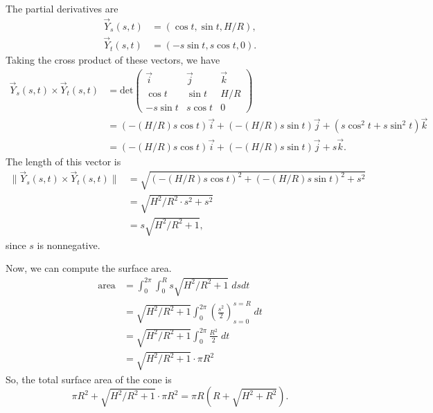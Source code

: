\documentclass{ximera}
\begin{document}
\begin{example}
The partial derivatives are
\begin{align*}
\vec{Y}_s(s,t) &= (\cos t, \sin t, H/R),\\
\vec{Y}_t(s,t) &= (-s\sin t, s\cos t, 0).
\end{align*}
Taking the cross product of these vectors, we have
\begin{align*}
\vec{Y}_s(s,t)\times\vec{Y}_t(s,t) &= \text{det}\begin{pmatrix}
\vec{i} & \vec{j} & \vec{k} \\
\cos t & \sin t & H/R\\
-s\sin t & s\cos t & 0
\end{pmatrix}\\
&= (-(H/R) s\cos t)\vec{i} + (-(H/R)s\sin t)\vec{j} + (s\cos^2 t + s\sin^2 t)\vec{k}\\
&= (-(H/R) s\cos t)\vec{i} + (-(H/R)s\sin t)\vec{j} + s\vec{k}.
\end{align*}
The length of this vector is
\begin{align*}
\|\vec{Y}_s(s,t)\times\vec{Y}_t(s,t)\| &= \sqrt{(-(H/R) s\cos t)^2 + (-(H/R) s\sin t)^2 + s^2}\\
&= \sqrt{H^2/R^2\cdot s^2 + s^2}\\
&= s\sqrt{H^2/R^2+1},
\end{align*}
since $s$ is nonnegative.

Now, we can compute the surface area.
\begin{align*}
\text{area} &= \int_0^{2\pi}\int_0^R s\sqrt{H^2/R^2+1}\;dsdt\\
&= \sqrt{H^2/R^2+1}\int_0^{2\pi} \left(\frac{s^2}{2}\right)_{s = 0}^{s = R}\;dt\\
&= \sqrt{H^2/R^2+1}\int_0^{2\pi} \frac{R^2}{2}\;dt\\
&= \sqrt{H^2/R^2+1}\cdot \pi R^2
\end{align*}
So, the total surface area of the cone is
\[
\pi R^2 + \sqrt{H^2/R^2+1}\cdot \pi R^2 = \pi R \left(R + \sqrt{H^2 + R^2}\right).
\]
\end{example}
\end{document}
